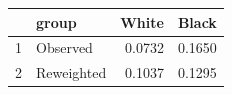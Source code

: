 \begin{table}[ht]
\centering
\begin{tabular}{rlrr}
  \hline
 & group & White & Black \\ 
  \hline
1 & Observed & 0.0732 & 0.1650 \\ 
  2 & Reweighted & 0.1037 & 0.1295 \\ 
   \hline
\end{tabular}
\end{table}
